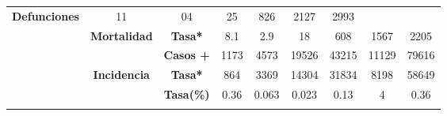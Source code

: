 \begin{tabular}{ccc|cccccc|}
		\multirow{-2}{*}{\cellcolor[HTML]{FFFFC7}\textbf{Defunciones}} &
		\multicolumn{1}{c|}{\multirow{-2}{*}{\cellcolor[HTML]{FFFFC7}11}} &
		\multicolumn{1}{c|}{\multirow{-2}{*}{\cellcolor[HTML]{FFFFC7}04}} &
		\multicolumn{1}{c|}{\multirow{-2}{*}{\cellcolor[HTML]{FFFFC7}25}} &
		\multicolumn{1}{c|}{\multirow{-2}{*}{\cellcolor[HTML]{FFFFC7}826}} &
		\multicolumn{1}{c|}{\multirow{-2}{*}{\cellcolor[HTML]{FFFFC7}2127}} &
		\multirow{-2}{*}{\cellcolor[HTML]{FFFFC7}2993} \\ \cline{3-9} 
		\rowcolor[HTML]{FFFFC7} 
		\multicolumn{1}{|c|}{\cellcolor[HTML]{FFFFC7}} &
		\multicolumn{1}{c|}{\multirow{-2}{*}{\cellcolor[HTML]{FFFFC7}\textbf{Mortalidad}}} &
		\textbf{Tasa*} &
		\multicolumn{1}{c|}{\cellcolor[HTML]{FFFFC7}8.1} &
		\multicolumn{1}{c|}{\cellcolor[HTML]{FFFFC7}2.9} &
		\multicolumn{1}{c|}{\cellcolor[HTML]{FFFFC7}18} &
		\multicolumn{1}{c|}{\cellcolor[HTML]{FFFFC7}608} &
		\multicolumn{1}{c|}{\cellcolor[HTML]{FFFFC7}1567} &
		2205 \\ \cline{2-9} 
		\rowcolor[HTML]{FFFFC7} 
		\multicolumn{1}{|c|}{\cellcolor[HTML]{FFFFC7}} &
		\multicolumn{1}{c|}{\cellcolor[HTML]{FFFFC7}} &
		\textbf{Casos +} &
		\multicolumn{1}{c|}{\cellcolor[HTML]{FFFFC7}1173} &
		\multicolumn{1}{c|}{\cellcolor[HTML]{FFFFC7}4573} &
		\multicolumn{1}{c|}{\cellcolor[HTML]{FFFFC7}19526} &
		\multicolumn{1}{c|}{\cellcolor[HTML]{FFFFC7}43215} &
		\multicolumn{1}{c|}{\cellcolor[HTML]{FFFFC7}11129} &
		79616 \\ \cline{3-9} 
		\rowcolor[HTML]{FFFFC7} 
		\multicolumn{1}{|c|}{\multirow{-6}{*}{\cellcolor[HTML]{FFFFC7}\textbf{2021}}} &
		\multicolumn{1}{c|}{\multirow{-2}{*}{\cellcolor[HTML]{FFFFC7}\textbf{Incidencia}}} &
		\textbf{Tasa*} &
		\multicolumn{1}{c|}{\cellcolor[HTML]{FFFFC7}864} &
		\multicolumn{1}{c|}{\cellcolor[HTML]{FFFFC7}3369} &
		\multicolumn{1}{c|}{\cellcolor[HTML]{FFFFC7}14304} &
		\multicolumn{1}{c|}{\cellcolor[HTML]{FFFFC7}31834} &
		\multicolumn{1}{c|}{\cellcolor[HTML]{FFFFC7}8198} &
		58649 \\ \hline
		\rowcolor[HTML]{E2EFDA} 
		\multicolumn{1}{|c|}{\cellcolor[HTML]{E2EFDA}} &
		\multicolumn{1}{c|}{\cellcolor[HTML]{E2EFDA}} &
		\textbf{Tasa(\%)} 
		&\multicolumn{1}{c|}{\cellcolor[HTML]{E2EFDA}0.36} 
		&\multicolumn{1}{c|}{\cellcolor[HTML]{E2EFDA}0.063} 
		&\multicolumn{1}{c|}{\cellcolor[HTML]{E2EFDA}0.023} 
		&\multicolumn{1}{c|}{\cellcolor[HTML]{E2EFDA}0.13} 
		&\multicolumn{1}{c|}{\cellcolor[HTML]{E2EFDA}4} 
		&0.36 \\ \cline{3-9} 
		\rowcolor[HTML]{E2EFDA} 
		\multicolumn{1}{|c|}{\cellcolor[HTML]{E2EFDA}} 

\end{tabular}
